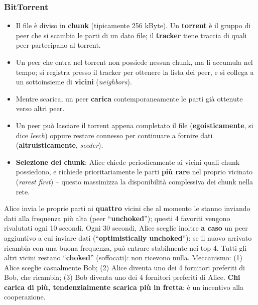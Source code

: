 \documentclass[12pt, a4paper]{article}
\begin{document}
\subsubsection{BitTorrent}

\begin{itemize}
    \item Il file è diviso in \textbf{chunk} (tipicamente 256 kByte). Un \textbf{torrent} è il gruppo di peer che si scambia le parti di un dato file; il \textbf{tracker} tiene traccia di quali peer partecipano al torrent.
    \item Un peer che entra nel torrent non possiede nessun chunk, ma li accumula nel tempo; si registra presso il tracker per ottenere la lista dei peer, e si collega a un sottoinsieme di \textbf{vicini} (\textit{neighbors}).
    \item Mentre scarica, un peer \textbf{carica} contemporaneamente le parti già ottenute verso altri peer.
    \item Un peer può lasciare il torrent appena completato il file (\textbf{egoisticamente}, si dice \textit{leech}) oppure restare connesso per continuare a fornire dati (\textbf{altruisticamente}, \textit{seeder}).
    \item \textbf{Selezione dei chunk}: Alice chiede periodicamente ai vicini quali chunk possiedono, e richiede prioritariamente le parti \textbf{più rare} nel proprio vicinato (\textit{rarest first}) -- questo massimizza la disponibilità complessiva dei chunk nella rete.
\end{itemize}

\begin{tcolorbox}[colback=lightergray!10, colframe=tocsec, title=\textbf{``Tit for tat'' -- occhio per occhio}]
Alice invia le proprie parti ai \textbf{quattro} vicini che al momento le stanno inviando dati alla frequenza più alta (peer ``\textbf{unchoked}''); questi 4 favoriti vengono rivalutati ogni 10 secondi. Ogni 30 secondi, Alice sceglie inoltre \textbf{a caso} un peer aggiuntivo a cui inviare dati (``\textbf{optimistically unchoked}''): se il nuovo arrivato ricambia con una buona frequenza, può entrare stabilmente nei top 4. Tutti gli altri vicini restano ``\textbf{choked}'' (soffocati): non ricevono nulla. Meccanismo: (1) Alice sceglie casualmente Bob; (2) Alice diventa uno dei 4 fornitori preferiti di Bob, che ricambia; (3) Bob diventa uno dei 4 fornitori preferiti di Alice. \textbf{Chi carica di più, tendenzialmente scarica più in fretta}: è un incentivo alla cooperazione.
\end{tcolorbox}
\end{document}
